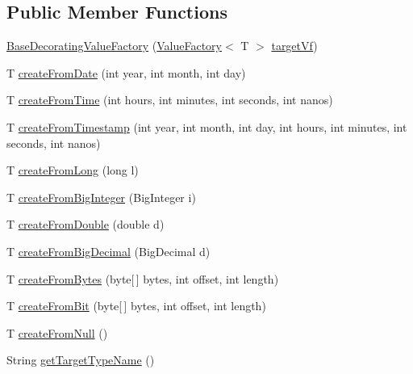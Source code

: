 \subsection*{Public Member Functions}
\begin{DoxyCompactItemize}
\item 
\mbox{\hyperlink{classcom_1_1mysql_1_1cj_1_1result_1_1_base_decorating_value_factory_adf77416836995015dd8a6f214749b8b4}{Base\+Decorating\+Value\+Factory}} (\mbox{\hyperlink{interfacecom_1_1mysql_1_1cj_1_1result_1_1_value_factory}{Value\+Factory}}$<$ T $>$ \mbox{\hyperlink{classcom_1_1mysql_1_1cj_1_1result_1_1_base_decorating_value_factory_a64c2c62bd9906ec3af7fc62e58bf34b3}{target\+Vf}})
\item 
T \mbox{\hyperlink{classcom_1_1mysql_1_1cj_1_1result_1_1_base_decorating_value_factory_a4c72385aed83cc4c020b79beabe53a5e}{create\+From\+Date}} (int year, int month, int day)
\item 
T \mbox{\hyperlink{classcom_1_1mysql_1_1cj_1_1result_1_1_base_decorating_value_factory_a596f4a15a63fa7f42aa6116fc52f40aa}{create\+From\+Time}} (int hours, int minutes, int seconds, int nanos)
\item 
T \mbox{\hyperlink{classcom_1_1mysql_1_1cj_1_1result_1_1_base_decorating_value_factory_a06ee3ccab4aaf494a1856920107134fc}{create\+From\+Timestamp}} (int year, int month, int day, int hours, int minutes, int seconds, int nanos)
\item 
T \mbox{\hyperlink{classcom_1_1mysql_1_1cj_1_1result_1_1_base_decorating_value_factory_afac99d3f28348caf19dbd661c609fb9f}{create\+From\+Long}} (long l)
\item 
T \mbox{\hyperlink{classcom_1_1mysql_1_1cj_1_1result_1_1_base_decorating_value_factory_aa9ea00497fa096349c600f09f54d2957}{create\+From\+Big\+Integer}} (Big\+Integer i)
\item 
T \mbox{\hyperlink{classcom_1_1mysql_1_1cj_1_1result_1_1_base_decorating_value_factory_a7339df10ef5bc202ad0568b232afd530}{create\+From\+Double}} (double d)
\item 
T \mbox{\hyperlink{classcom_1_1mysql_1_1cj_1_1result_1_1_base_decorating_value_factory_a59304834ff6d8d74b8555d2fcb70a46e}{create\+From\+Big\+Decimal}} (Big\+Decimal d)
\item 
T \mbox{\hyperlink{classcom_1_1mysql_1_1cj_1_1result_1_1_base_decorating_value_factory_a36b451b3b030ef65417756206968626e}{create\+From\+Bytes}} (byte\mbox{[}$\,$\mbox{]} bytes, int offset, int length)
\item 
T \mbox{\hyperlink{classcom_1_1mysql_1_1cj_1_1result_1_1_base_decorating_value_factory_ae424a4142df77302b0cc712d8d6b38be}{create\+From\+Bit}} (byte\mbox{[}$\,$\mbox{]} bytes, int offset, int length)
\item 
T \mbox{\hyperlink{classcom_1_1mysql_1_1cj_1_1result_1_1_base_decorating_value_factory_aa7c19e3967273a1c5b806c858165200a}{create\+From\+Null}} ()
\item 
String \mbox{\hyperlink{classcom_1_1mysql_1_1cj_1_1result_1_1_base_decorating_value_factory_a50680123fa3626dd2a9fbb6e4fd01f0b}{get\+Target\+Type\+Name}} ()
\end{DoxyCompactItemize}
